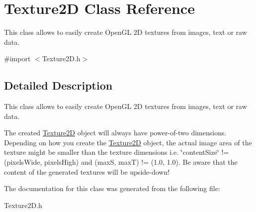 \hypertarget{interface_texture2_d}{
\section{Texture2D Class Reference}
\label{interface_texture2_d}
}


This class allows to easily create OpenGL 2D textures from images, text or raw data.  




{\ttfamily \#import $<$Texture2D.h$>$}



\subsection{Detailed Description}
This class allows to easily create OpenGL 2D textures from images, text or raw data. 

The created \hyperlink{interface_texture2_d}{Texture2D} object will always have power-\/of-\/two dimensions. Depending on how you create the \hyperlink{interface_texture2_d}{Texture2D} object, the actual image area of the texture might be smaller than the texture dimensions i.e. \char`\"{}contentSize\char`\"{} != (pixelsWide, pixelsHigh) and (maxS, maxT) != (1.0, 1.0). Be aware that the content of the generated textures will be upside-\/down! 

The documentation for this class was generated from the following file:\begin{DoxyCompactItemize}
\item 
Texture2D.h\end{DoxyCompactItemize}
